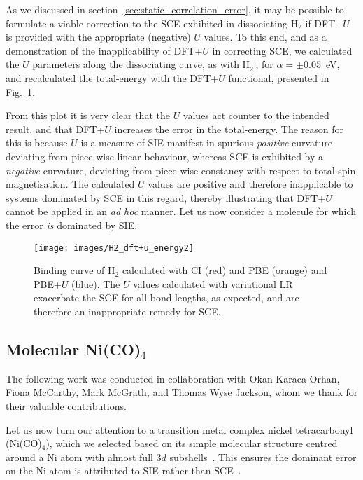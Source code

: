 As we discussed in section~\ref{sec:static_correlation_error}, 
it may be possible to formulate a viable correction 
to the SCE exhibited in dissociating H$_2$ 
if DFT+$U$ is provided with the appropriate (negative) $U$ values. 
%
To this end, 
and as a demonstration of the inapplicability of 
DFT+$U$ in correcting SCE, 
we calculated the $U$ parameters along 
the dissociating curve, as with H$_2^+$, 
for $\alpha=\pm0.05$~eV, 
and recalculated the total-energy 
with the DFT+$U$ functional, 
presented in Fig.~\ref{fig:H2_dft+u_energy2}.

From this plot it is very clear that 
the $U$ values act counter to the intended result, 
and that DFT+$U$ increases the error in the total-energy.
%
The reason for this is because $U$ is a measure 
of SIE manifest in spurious {\it positive} curvature 
deviating from piece-wise linear behaviour, 
whereas SCE is exhibited by a {\it negative} curvature, 
deviating from piece-wise constancy 
with respect to total spin magnetisation.
%
The calculated $U$ values are positive 
and therefore inapplicable to 
{systems dominated by} SCE in this regard, 
thereby illustrating that DFT+$U$ cannot be 
applied in an {\it ad hoc} manner.
%
{
Let us now consider a molecule 
for which the error {\it is} dominated by SIE}.

\begin{figure}[th!]
\centering
\texttt{[image: images/H2\_dft+u\_energy2]}
\caption[PBE+$U$ binding curve of H$_2$ with linear-response $U$]
{Binding curve of H$_2$ 
calculated with CI (red) and 
PBE (orange) and PBE+$U$ (blue).
%
The $U$ values calculated with variational LR
exacerbate the SCE for all bond-lengths, as expected, 
and are therefore an inappropriate remedy for SCE.}
\label{fig:H2_dft+u_energy2}
\end{figure}


\subsection{Molecular Ni(CO)$_4$}

{
The following work was conducted in collaboration with 
Okan Karaca Orhan, Fiona McCarthy, 
Mark McGrath, and Thomas Wyse Jackson, 
whom we  thank for their valuable contributions.}

Let us now turn our attention to 
a transition metal complex nickel tetracarbonyl (Ni(CO)$_4$), 
which we selected based on its simple molecular structure 
centred around a Ni atom with 
almost full 3$d$ subshells~\cite{orhan2017tddft+}.
%
This ensures the dominant error on the Ni atom 
is attributed to SIE rather than 
SCE~\cite{PhysRevB.77.115123,cohen2008insights}.

